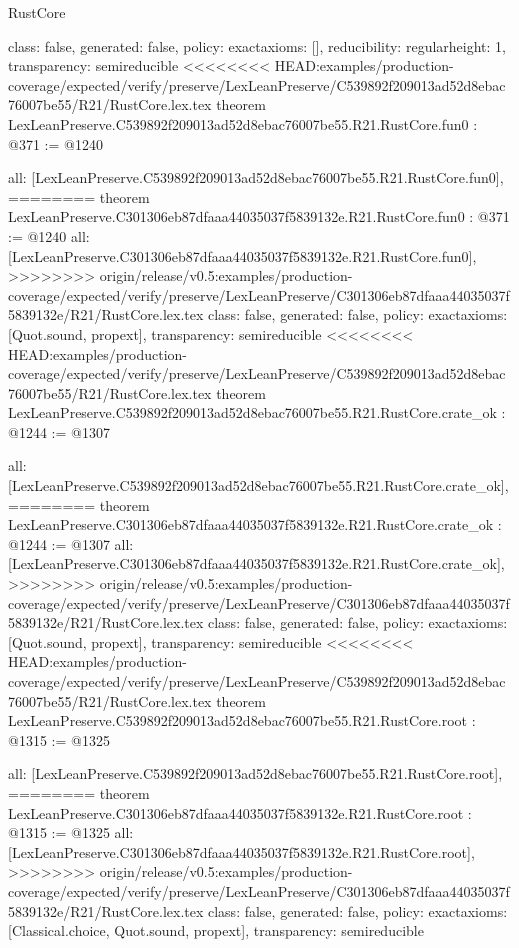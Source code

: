 \begin{lexlean}{RustCore}
\begin{coremodule}
{\begin{coremodule}
{{{  class: false,
  generated: false,
  policy: exact{axioms: []},
  reducibility: regular{height: 1},
  transparency: semireducible
}
<<<<<<<< HEAD:examples/production-coverage/expected/verify/preserve/LexLeanPreserve/C539892f209013ad52d8ebac76007be55/R21/RustCore.lex.tex
theorem LexLeanPreserve.C539892f209013ad52d8ebac76007be55.R21.RustCore.fun0 : @371 := @1240 {
  all: [LexLeanPreserve.C539892f209013ad52d8ebac76007be55.R21.RustCore.fun0],
========
theorem LexLeanPreserve.C301306eb87dfaaa44035037f5839132e.R21.RustCore.fun0 : @371 := @1240 {
  all: [LexLeanPreserve.C301306eb87dfaaa44035037f5839132e.R21.RustCore.fun0],
>>>>>>>> origin/release/v0.5:examples/production-coverage/expected/verify/preserve/LexLeanPreserve/C301306eb87dfaaa44035037f5839132e/R21/RustCore.lex.tex
  class: false,
  generated: false,
  policy: exact{axioms: [Quot.sound, propext]},
  transparency: semireducible
}
<<<<<<<< HEAD:examples/production-coverage/expected/verify/preserve/LexLeanPreserve/C539892f209013ad52d8ebac76007be55/R21/RustCore.lex.tex
theorem LexLeanPreserve.C539892f209013ad52d8ebac76007be55.R21.RustCore.crate_ok : @1244 := @1307 {
  all: [LexLeanPreserve.C539892f209013ad52d8ebac76007be55.R21.RustCore.crate_ok],
========
theorem LexLeanPreserve.C301306eb87dfaaa44035037f5839132e.R21.RustCore.crate_ok : @1244 := @1307 {
  all: [LexLeanPreserve.C301306eb87dfaaa44035037f5839132e.R21.RustCore.crate_ok],
>>>>>>>> origin/release/v0.5:examples/production-coverage/expected/verify/preserve/LexLeanPreserve/C301306eb87dfaaa44035037f5839132e/R21/RustCore.lex.tex
  class: false,
  generated: false,
  policy: exact{axioms: [Quot.sound, propext]},
  transparency: semireducible
}
<<<<<<<< HEAD:examples/production-coverage/expected/verify/preserve/LexLeanPreserve/C539892f209013ad52d8ebac76007be55/R21/RustCore.lex.tex
theorem LexLeanPreserve.C539892f209013ad52d8ebac76007be55.R21.RustCore.root : @1315 := @1325 {
  all: [LexLeanPreserve.C539892f209013ad52d8ebac76007be55.R21.RustCore.root],
========
theorem LexLeanPreserve.C301306eb87dfaaa44035037f5839132e.R21.RustCore.root : @1315 := @1325 {
  all: [LexLeanPreserve.C301306eb87dfaaa44035037f5839132e.R21.RustCore.root],
>>>>>>>> origin/release/v0.5:examples/production-coverage/expected/verify/preserve/LexLeanPreserve/C301306eb87dfaaa44035037f5839132e/R21/RustCore.lex.tex
  class: false,
  generated: false,
  policy: exact{axioms: [Classical.choice, Quot.sound, propext]},
  transparency: semireducible
}

}}}}}
\end{coremodule}}
\end{coremodule}
\end{lexlean}
